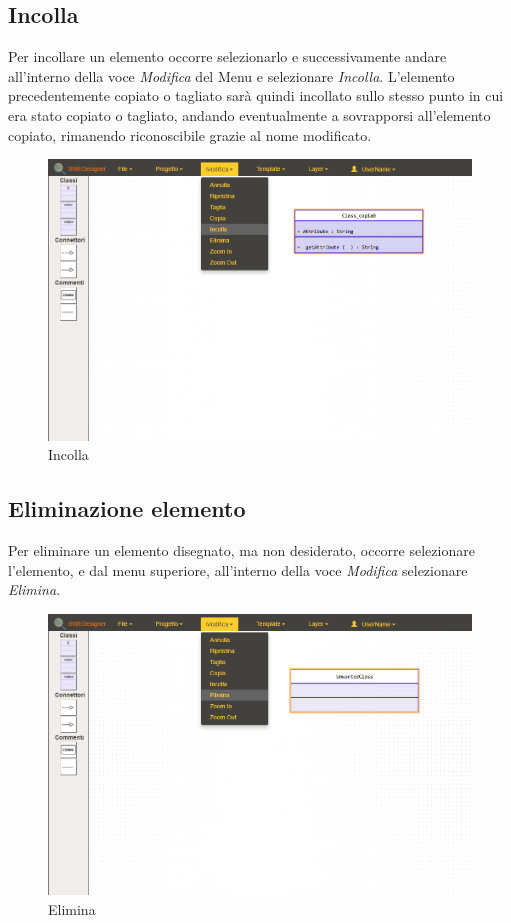 \subsection{Incolla}
Per incollare un elemento occorre selezionarlo e successivamente andare all'interno della voce \textit{Modifica} del Menu e selezionare \textit{Incolla}. L'elemento precedentemente copiato o tagliato sarà quindi incollato sullo stesso punto in cui era stato copiato o tagliato, andando eventualmente a sovrapporsi all'elemento copiato, rimanendo riconoscibile grazie al nome modificato.\\
\begin{figure}[H]
	\centering
		\includegraphics[width=1\linewidth]{res/img/incolla.png}
	\caption{Incolla}
\end{figure}
\newpage

\subsection{Eliminazione elemento}
Per eliminare un elemento disegnato, ma non desiderato, occorre selezionare l'elemento, e dal menu superiore, all'interno della voce \textit{Modifica} selezionare \textit{Elimina}.\\
\begin{figure}[H]
	\centering
		\includegraphics[width=1\linewidth]{res/img/elimina.png}
	\caption{Elimina}
\end{figure}
\newpage

